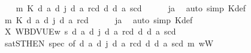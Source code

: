 \begin{isabellebody}
\ \ \isamarkupfalse%
\ m{}{\isacharcolon}{\kern0pt}\ {\isachardoublequoteopen}{\isasymGamma}\isactrlsub K\ {\isacharparenleft}{\kern0pt}{\isasymD}\isactrlsup d\ a\ {\isacharparenleft}{\kern0pt}{\isasymB}\isactrlsup d\ j\ {\isacharparenleft}{\kern0pt}{\isasymB}\isactrlsup d\ a\ {\isacharbraceleft}{\kern0pt}r\isactrlsup c{\isacharbraceright}{\kern0pt}\isactrlsup d\ {\isasymsupset}\isactrlsup d\ {\isasymB}\isactrlsup d\ a\ {\isacharbraceleft}{\kern0pt}s\isactrlsup c{\isacharbraceright}{\kern0pt}\isactrlsup d{\isacharparenright}{\kern0pt}{\isacharparenright}{\kern0pt}{\isacharparenright}{\kern0pt}{\isachardoublequoteclose}\isanewline
\ \ \ \ \isamarkupfalse%
\ ja\ \isamarkupfalse%
\ {\isacharparenleft}{\kern0pt}auto\ simp{\isacharcolon}{\kern0pt}\ {\isasymGamma}\isactrlsub K{\isacharunderscore}{\kern0pt}def{\isacharparenright}{\kern0pt}\isanewline
\ \ \isamarkupfalse%
\ m{}{\isacharcolon}{\kern0pt}\ {\isachardoublequoteopen}{\isasymGamma}\isactrlsub K\ {\isacharparenleft}{\kern0pt}{\isasymD}\isactrlsup d\ a\ {\isacharparenleft}{\kern0pt}{\isasymB}\isactrlsup d\ j\ {\isacharparenleft}{\kern0pt}{\isasymB}\isactrlsup d\ a\ {\isacharbraceleft}{\kern0pt}r\isactrlsup c{\isacharbraceright}{\kern0pt}\isactrlsup d{\isacharparenright}{\kern0pt}{\isacharparenright}{\kern0pt}{\isacharparenright}{\kern0pt}{\isachardoublequoteclose}\isanewline
\ \ \ \ \isamarkupfalse%
\ ja\ \isamarkupfalse%
\ {\isacharparenleft}{\kern0pt}auto\ simp{\isacharcolon}{\kern0pt}\ {\isasymGamma}\isactrlsub K{\isacharunderscore}{\kern0pt}def{\isacharparenright}{\kern0pt}\isanewline
\ \ \isamarkupfalse%
\ X{\isacharcolon}{\kern0pt}\ {\isachardoublequoteopen}{\isasymlangle}W{\isacharcomma}{\kern0pt}B{\isacharcomma}{\kern0pt}D{\isacharcomma}{\kern0pt}V{\isacharcomma}{\kern0pt}U{\isacharcomma}{\kern0pt}E{\isasymrangle}{\isacharcomma}{\kern0pt}w\ {\isasymTurnstile}\isactrlsup s\ {\isasymlparr}{\isasymD}\isactrlsup d\ a\ {\isacharparenleft}{\kern0pt}{\isasymB}\isactrlsup d\ j\ {\isacharparenleft}{\kern0pt}{\isasymB}\isactrlsup d\ a\ {\isacharbraceleft}{\kern0pt}r\isactrlsup c{\isacharbraceright}{\kern0pt}\isactrlsup d\ {\isasymsupset}\isactrlsup d\ {\isasymB}\isactrlsup d\ a\ {\isacharbraceleft}{\kern0pt}s\isactrlsup c{\isacharbraceright}{\kern0pt}\isactrlsup d{\isacharparenright}{\kern0pt}{\isacharparenright}{\kern0pt}{\isasymrparr}{\isachardoublequoteclose}\isanewline
\ \ \ \ \isamarkupfalse%
\ satS{\isacharbrackleft}{\kern0pt}THEN\ spec{\isacharcomma}{\kern0pt}\ of\ {\isachardoublequoteopen}{\isasymD}\isactrlsup d\ a\ {\isacharparenleft}{\kern0pt}{\isasymB}\isactrlsup d\ j\ {\isacharparenleft}{\kern0pt}{\isasymB}\isactrlsup d\ a\ {\isacharbraceleft}{\kern0pt}r\isactrlsup c{\isacharbraceright}{\kern0pt}\isactrlsup d\ {\isasymsupset}\isactrlsup d\ {\isasymB}\isactrlsup d\ a\ {\isacharbraceleft}{\kern0pt}s\isactrlsup c{\isacharbraceright}{\kern0pt}\isactrlsup d{\isacharparenright}{\kern0pt}{\isacharparenright}{\kern0pt}{\isachardoublequoteclose}{\isacharbrackright}{\kern0pt}\ m{}\ wW\ \isamarkupfalse%

\end{isabellebody}
